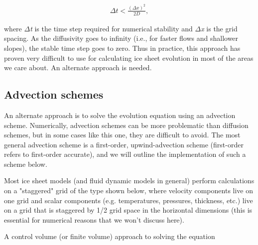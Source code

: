 \begin{align*}
\Delta t<\frac{\left( \Delta x \right)^{2}}{2D},
\end{align*}

where \textit{\(\Delta{}\)t} is the time step required for numerical stability and \textit{\(\Delta{}\)x} is the grid spacing. As the diffusivity goes to infinity (i.e., for faster flows and shallower slopes), the stable time step goes to zero. Thus in practice, this approach has proven very difficult to use for calculating ice sheet evolution in most of the areas we care about. An alternate approach is needed.

\subsection{Advection schemes}
An alternate approach is to solve the evolution equation using an advection scheme. Numerically, advection schemes can be more problematic than diffusion schemes, but in some cases like this one, they are difficult to avoid. The most general advection scheme is a first-order, upwind-advection scheme (first-order refers to first-order accurate), and we will outline the implementation of such a scheme below.

Most ice sheet models (and fluid dynamic models in general) perform calculations on a "staggered" grid of the type shown below, where velocity components live on one grid and scalar components (e.g. temperatures, pressures, thickness, etc.) live on a grid that is staggered by 1/2 grid space in the horizontal dimensions (this is essential for numerical reasons that we won't discuss here).


A control volume (or finite volume) approach to solving the equation 

